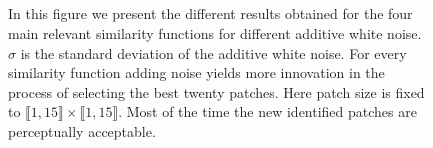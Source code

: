   \begin{figure}[H]
    \centering
   \hfill
   \hfill
   \hfill \\
   \hfill 
   \hfill
   \hfill \\
   \hfill
   \hfill
   \hfill \\
   \hfill
   \hfill
   \hfill \\
  \caption{In this figure we present the different results obtained for the four main relevant similarity functions for different additive white noise. $\sigma$ is the standard deviation of the additive white noise. For every similarity function adding noise yields more innovation in the process of selecting the best twenty patches. Here patch size is fixed to $\llbracket 1,15 \rrbracket \times \llbracket 1,15 \rrbracket$. Most of the time the new identified patches are perceptually acceptable.}
  \label{fig:noise_general}
\end{figure}
